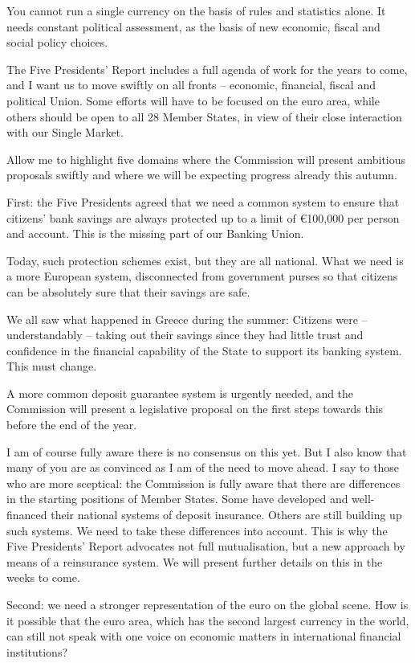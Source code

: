 \documentclass[a4paper,11pt]{article}
\begin{document}
You cannot run a single currency on the basis of rules and statistics alone. It needs constant political assessment, as the basis of new economic, fiscal and social policy choices.

The Five Presidents' Report includes a full agenda of work for the years to come, and I want us to move swiftly on all fronts – economic, financial, fiscal and political Union. Some efforts will have to be focused on the euro area, while others should be open to all 28 Member States, in view of their close interaction with our Single Market.

Allow me to highlight five domains where the Commission will present ambitious proposals swiftly and where we will be expecting progress already this autumn.

First: the Five Presidents agreed that we need a common system to ensure that citizens' bank savings are always protected up to a limit of \euro100,000 per person and account. This is the missing part of our Banking Union.

Today, such protection schemes exist, but they are all national. What we need is a more European system, disconnected from government purses so that citizens can be absolutely sure that their savings are safe.

We all saw what happened in Greece during the summer: Citizens were – understandably – taking out their savings since they had little trust and confidence in the financial capability of the State to support its banking system. This must change.

A more common deposit guarantee system is urgently needed, and the Commission will present a legislative proposal on the first steps towards this before the end of the year.

I am of course fully aware there is no consensus on this yet. But I also know that many of you are as convinced as I am of the need to move ahead. I say to those who are more sceptical: the Commission is fully aware that there are differences in the starting positions of Member States. Some have developed and well-financed their national systems of deposit insurance. Others are still building up such systems. We need to take these differences into account. This is why the Five Presidents’ Report advocates not full mutualisation, but a new approach by means of a reinsurance system. We will present further details on this in the weeks to come.

Second: we need a stronger representation of the euro on the global scene. How is it possible that the euro area, which has the second largest currency in the world, can still not speak with one voice on economic matters in international financial institutions?
\end{document}
